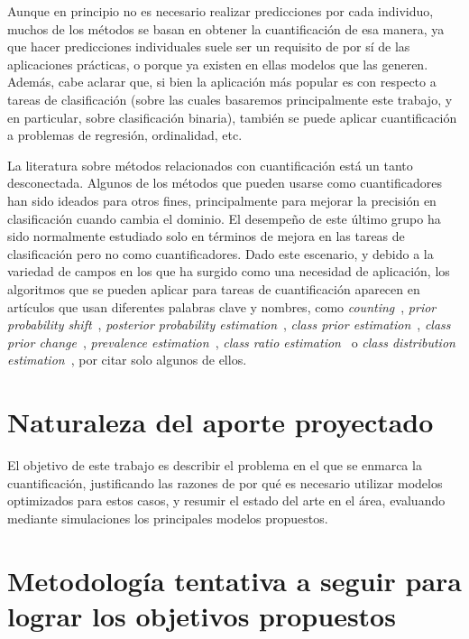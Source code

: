 \documentclass[a4paper, twoside, 11pt, spanish]{article}
\begin{document}
Aunque en principio no es necesario realizar predicciones por cada individuo,
muchos de los métodos se basan en obtener la cuantificación de esa manera, ya
que hacer predicciones individuales suele ser un requisito de por sí de las
aplicaciones prácticas, o porque ya existen en ellas modelos que las generen.
Además, cabe aclarar que, si bien la aplicación más popular es con respecto a
tareas de clasificación (sobre las cuales basaremos principalmente este trabajo,
y en particular, sobre clasificación binaria), también se puede aplicar
cuantificación a problemas de regresión, ordinalidad, etc.

La literatura sobre métodos relacionados con cuantificación está un tanto
desconectada. Algunos de los métodos que pueden usarse como cuantificadores han
sido ideados para otros fines, principalmente para mejorar la precisión en
clasificación cuando cambia el dominio. El desempeño de este último grupo ha
sido normalmente estudiado solo en términos de mejora en las tareas de
clasificación pero no como cuantificadores. Dado este escenario, y debido a la
variedad de campos en los que ha surgido como una necesidad de aplicación, los
algoritmos que se pueden aplicar para tareas de cuantificación aparecen en
artículos que usan diferentes palabras clave y nombres, como {\it
counting\/}~\cite{lewis1995evaluating}, {\it prior probability
shift\/}~\cite{moreno2012unifying, storkey2009training}, {\it posterior
probability estimation\/}~\cite{alaiz2011class}, {\it class prior
estimation\/}~\cite{du2014class, chan2006estimating, zhang2010transfer}, {\it
class prior change\/}~\cite{du2014semi}, {\it prevalence
estimation\/}~\cite{barranquero2013study}, {\it class ratio
estimation\/}~\cite{asoh2012fast} o {\it class distribution
estimation\/}~\cite{gonzalez2013class, limsetto2011handling,
xue2009quantification}, por citar solo algunos de ellos.

\section*{Naturaleza del aporte proyectado}

El objetivo de este trabajo es describir el problema en el que se enmarca la
cuantificación, justificando las razones de por qué es necesario utilizar
modelos optimizados para estos casos, y resumir el estado del arte en el área,
evaluando mediante simulaciones los principales modelos propuestos.

\section*{Metodología tentativa a seguir para lograr los objetivos propuestos}
\end{document}
